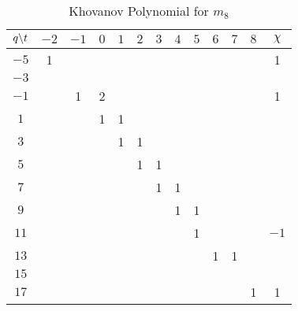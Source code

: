 \documentclass{article}
\theoremstyle{plain}
\begin{document}
        \begin{table}[H]
            \centering
            \begin{tabular}{| c | c | c | c | c | c | c | c | c | c | c | c | c |}
                \hline
                $q\symbol{92}t$&$-2$&$-1$&$0$&$1$&$2$&$3$&$4$&$5$&$6$&$7$&$8$&$\chi$\\
                \hline
                $-5$&1&&&&&&&&&&&1\\
                \hline
                $-3$&&&&&&&&&&&&\\
                \hline
                $-1$&&1&2&&&&&&&&&1\\
                \hline
                $1$&&&1&1&&&&&&&&\\
                \hline
                $3$&&&&1&1&&&&&&&\\
                \hline
                $5$&&&&&1&1&&&&&&\\
                \hline
                $7$&&&&&&1&1&&&&&\\
                \hline
                $9$&&&&&&&1&1&&&&\\
                \hline
                $11$&&&&&&&&1&&&&$-1$\\
                \hline
                $13$&&&&&&&&&1&1&&\\
                \hline
                $15$&&&&&&&&&&&&\\
                \hline
                $17$&&&&&&&&&&&1&1\\
                \hline
            \end{tabular}
            \caption{Khovanov Polynomial for $m_{8}$}
            \label{table:m_8_kho}
        \end{table}
\end{document}

